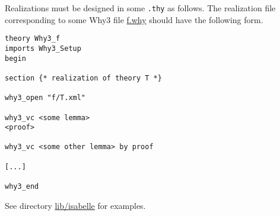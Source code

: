 Realizations must be designed in some \texttt{.thy} as follows. 
The realization file corresponding to some Why3 file \url{f.why}
should have the following form. 
\begin{verbatim}
theory Why3_f
imports Why3_Setup
begin

section {* realization of theory T *}

why3_open "f/T.xml"

why3_vc <some lemma> 
<proof>

why3_vc <some other lemma> by proof

[...]

why3_end
\end{verbatim}

See directory \url{lib/isabelle} for examples.


